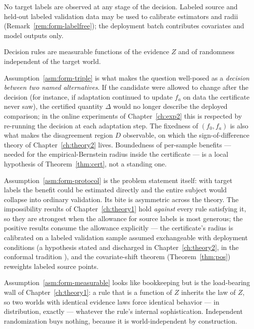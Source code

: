 \begin{assumption}\label{asm:form-protocol}
No target labels are observed at any stage of the decision. Labeled source
and held-out labeled validation data may be used to calibrate estimators and
radii (Remark~\ref{rem:form-labelfree}); the deployment batch contributes
covariates and model outputs only.
\end{assumption}

\begin{assumption}\label{asm:form-measurable}
Decision rules are measurable functions of the evidence $Z$ and of
randomness independent of the target world.
\end{assumption}

Assumption~\ref{asm:form-triple} is what makes the question well-posed as a
\emph{decision between two named alternatives}. If the candidate were
allowed to change after the decision (for instance, if adaptation continued
to update $f_a$ on data the certificate never saw), the certified quantity
$\Delta$ would no longer describe the deployed comparison; in the online
experiments of Chapter~\ref{ch:exp2} this is respected by re-running the
decision at each adaptation step. The fixedness of $(f_0,f_a)$ is also what
makes the disagreement region $D$ observable, on which the
sign-of-difference theory of Chapter~\ref{ch:theory2} lives. Boundedness of
per-sample benefits --- needed for the empirical-Bernstein radius
\cite{maurer2009empirical, hoeffding1963probability} inside the certificate
--- is a local hypothesis of Theorem~\ref{thm:cert}, not a standing one.

Assumption~\ref{asm:form-protocol} is the problem statement itself: with
target labels the benefit could be estimated directly and the entire subject
would collapse into ordinary validation. Its bite is asymmetric across the
theory. The impossibility results of Chapter~\ref{ch:theory1} hold
\emph{against} every rule satisfying it, so they are strongest when the
allowance for source labels is most generous; the positive results consume
the allowance explicitly --- the certificate's radius is calibrated on a
labeled validation sample assumed exchangeable with deployment conditions (a
hypothesis stated and discharged in Chapter~\ref{ch:theory2}, in the
conformal tradition \cite{vovk2005algorithmic}), and the covariate-shift
theorem (Theorem~\ref{thm:pos}) reweights labeled source points.

Assumption~\ref{asm:form-measurable} looks like bookkeeping but is the load-bearing
wall of Chapter~\ref{ch:theory1}: a rule that is a function of $Z$ inherits
the law of $Z$, so two worlds with identical evidence laws force identical
behavior --- in distribution, exactly --- whatever the rule's internal
sophistication. Independent randomization buys nothing, because it is
world-independent by construction.

